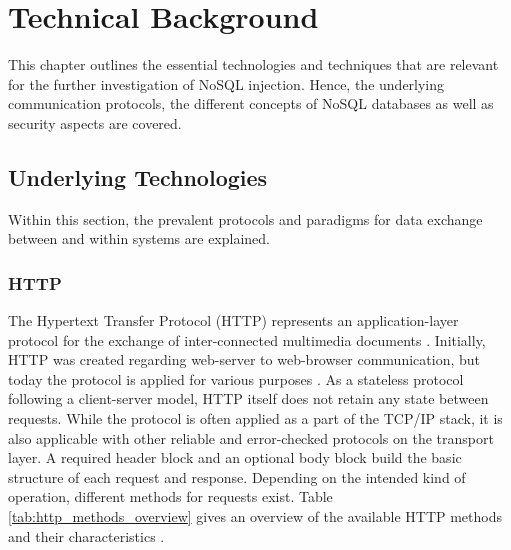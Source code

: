 \chapter{Technical Background}
\label{cha:technicalBackground}
This chapter outlines the essential technologies and techniques that are relevant for the further investigation of NoSQL injection. Hence, the underlying communication protocols, the different concepts of NoSQL databases as well as security aspects are covered.

\section{Underlying Technologies}
Within this section, the prevalent protocols and paradigms for data exchange between and within systems are explained.

\subsection{HTTP}
The Hypertext Transfer Protocol (HTTP) represents an application-layer protocol for the exchange of inter-connected multimedia documents \cite{Berners-Lee1996}. Initially, HTTP was created regarding web-server to web-browser communication, but today the protocol is applied for various purposes \cite{Fielding:1999}. As a stateless protocol following a client-server model, HTTP itself does not retain any state between requests. While the protocol is often applied as a part of the TCP/IP stack, it is also applicable with other reliable and error-checked protocols on the transport layer. A required header block and an optional body block build the basic structure of each request and response. Depending on the intended kind of operation, different methods for requests exist. Table \ref{tab:http_methods_overview} gives an overview of the available HTTP methods and their characteristics \cite{Fielding:1999}.\\

